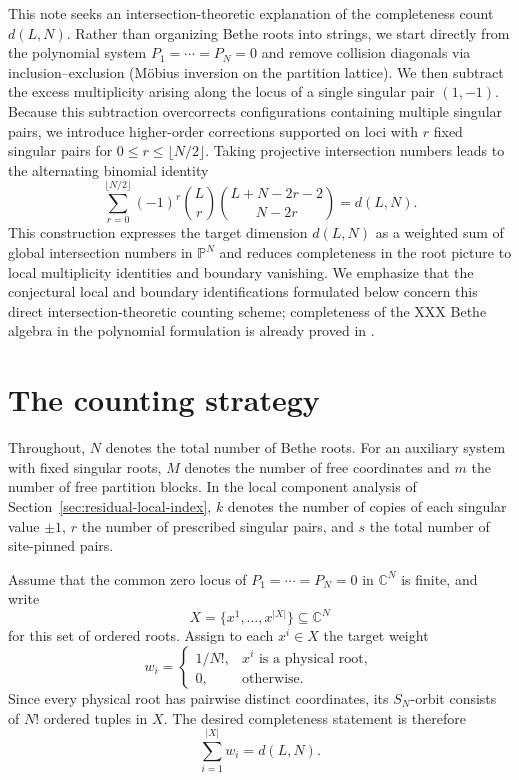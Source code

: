 \documentclass[11pt]{article}
\theoremstyle{definition}
\newcommand{\C}{\mathbb{C}}
\begin{document}
This note seeks an intersection-theoretic explanation of the
completeness count $d(L,N)$. Rather than organizing Bethe roots into strings,
we start directly from the polynomial system $P_1=\cdots=P_N=0$ and remove
collision diagonals via inclusion--exclusion (M\"obius inversion on the partition lattice). We then subtract the excess
multiplicity arising along the locus of a single singular pair $(1,-1)$. Because this
subtraction overcorrects configurations containing multiple singular
pairs, we introduce higher-order corrections supported on loci with
$r$ fixed singular pairs for $0\le r\le\lfloor N/2\rfloor$. Taking projective intersection numbers leads to the alternating binomial identity
\begin{equation}\label{eq:intro-alternating-count}
 \boxed{
 \sum_{r=0}^{\lfloor N/2\rfloor}(-1)^r\binom{L}{r}
       \binom{L+N-2r-2}{N-2r}
 =d(L,N).}
\end{equation}
This construction expresses the target dimension $d(L,N)$ as a weighted
sum of global intersection numbers in $\mathbb{P}^N$ and reduces completeness in the root picture to local multiplicity identities and boundary vanishing. We emphasize that the conjectural local and boundary
identifications formulated below concern this direct intersection-theoretic counting scheme; completeness of the XXX Bethe algebra in the polynomial formulation is already proved in \cite{MTV2009}.


\section{The counting strategy}
\label{sec:counting-strategy}

Throughout, $N$ denotes the total number of Bethe roots. For an auxiliary system
with fixed singular roots, $M$ denotes the number of free coordinates and $m$
the number of free partition blocks. In the local component analysis of Section~\ref{sec:residual-local-index}, $k$ denotes
the number of copies of each singular value $\pm 1$, $r$ the number of prescribed
singular pairs, and $s$ the total number of site-pinned pairs.

Assume that the common zero locus of $P_1=\cdots=P_N=0$ in $\C^N$ is finite,
and write
\[
X=\{x^1,\ldots,x^{|X|}\}\subseteq\C^N
\]
for this set of ordered roots. Assign to each $x^i\in X$ the target weight
\[
w_i=\begin{cases}
	1/N!, & x^i\text{ is a physical root},\\
	0, & \text{otherwise}.
\end{cases}
\]
Since every physical root has pairwise distinct coordinates, its $S_N$-orbit consists of $N!$ ordered tuples in $X$. The desired completeness statement is therefore
\begin{equation}\label{eq:target-weights}
	\sum_{i=1}^{|X|} w_i=d(L,N).
\end{equation}
\end{document}
